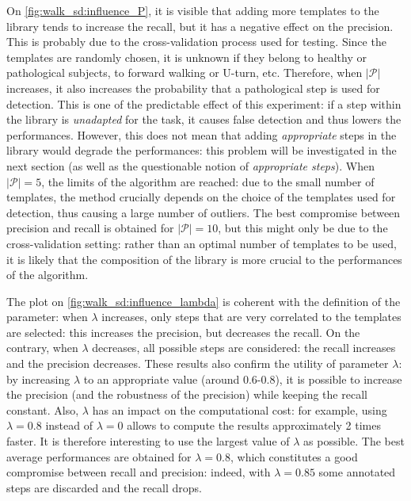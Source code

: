 \documentclass[../thesis.tex]{subfiles}
\begin{document}
On \autoref{fig:walk_sd:influence_P}, it is visible that adding more templates to the library tends to increase the recall, but it has a negative effect on the precision. This is probably due to the cross-validation process used for  testing. Since the templates are randomly chosen, it is unknown if they belong to healthy or pathological subjects, to forward walking or U-turn, etc. Therefore, when $|\mathcal{P}|$  increases, it also increases the probability that a pathological step is used for detection. This is one of the predictable effect of this experiment: if a step within the library is \textit{unadapted} for the task, it causes false detection and thus lowers the performances. However, this does not mean that adding \textit{appropriate} steps in the library would degrade the performances: this problem will be investigated in the next section (as well as the questionable notion of \textit{appropriate steps}). When $|\mathcal{P}| = 5$, the limits of the algorithm are reached: due to 
the small number of templates, the method crucially depends on the choice of the templates used for detection, thus causing a large number of outliers. The best compromise between precision and recall is obtained for  $|\mathcal{P}| = 10$, but this might only be due to the cross-validation setting: rather than an optimal number of templates to be used, it is likely that the composition of the library is more crucial to the performances of the algorithm.

 
 The plot on \autoref{fig:walk_sd:influence_lambda} is coherent with the definition of the parameter: when $\lambda$ increases, only steps that are very correlated to the templates are selected: this increases the  precision, but decreases the recall. On the contrary, when $\lambda$ decreases, all possible steps are considered: the recall increases and the precision decreases.  These results also confirm the utility of parameter $\lambda$: by increasing $\lambda$ to an appropriate value (around 0.6-0.8), it is possible to increase the precision (and the robustness of the precision) while keeping the recall constant. Also, $\lambda$ has an impact on the computational cost: for example, using $\lambda=0.8$ instead of $\lambda=0$ allows to compute the results approximately 2 times faster. It is therefore interesting to use the largest value of $\lambda$ as possible. The best average performances are obtained for  $\lambda = 0.8$, which constitutes a good compromise between recall and 
precision: indeed, with  $\lambda = 0.85$ some annotated steps are discarded and the recall drops.
\end{document}

